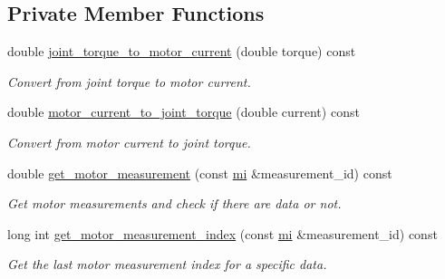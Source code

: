 \subsection*{Private Member Functions}
\begin{DoxyCompactItemize}
\item 
double \hyperlink{classblmc__robots_1_1BlmcJointModule_a2b6886df9dc909854ff74c2ec21cbb34}{joint\+\_\+torque\+\_\+to\+\_\+motor\+\_\+current} (double torque) const
\begin{DoxyCompactList}\small\item\em Convert from joint torque to motor current. \end{DoxyCompactList}\item 
double \hyperlink{classblmc__robots_1_1BlmcJointModule_aa300e4c820a6cd356ac77ba50829c50f}{motor\+\_\+current\+\_\+to\+\_\+joint\+\_\+torque} (double current) const
\begin{DoxyCompactList}\small\item\em Convert from motor current to joint torque. \end{DoxyCompactList}\item 
double \hyperlink{classblmc__robots_1_1BlmcJointModule_a219d4e433d03ea8a2bae115d5563d844}{get\+\_\+motor\+\_\+measurement} (const \hyperlink{common__header_8hpp_a1975c6bb47bc85dfc8edfe349c30dae1}{mi} \&measurement\+\_\+id) const
\begin{DoxyCompactList}\small\item\em Get motor measurements and check if there are data or not. \end{DoxyCompactList}\item 
long int \hyperlink{classblmc__robots_1_1BlmcJointModule_adf5e083076bdc53f24f14f0c22b9061b}{get\+\_\+motor\+\_\+measurement\+\_\+index} (const \hyperlink{common__header_8hpp_a1975c6bb47bc85dfc8edfe349c30dae1}{mi} \&measurement\+\_\+id) const
\begin{DoxyCompactList}\small\item\em Get the last motor measurement index for a specific data. \end{DoxyCompactList}\end{DoxyCompactItemize}
